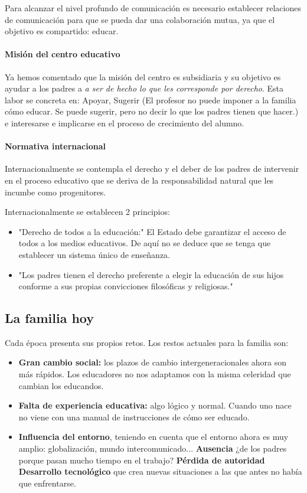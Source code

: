 \documentclass[palatino]{apuntesURJC}
\begin{document}
Para alcanzar el nivel profundo de comunicación es necesario establecer relaciones de comunicación para que se pueda dar una colaboración mutua, ya que el objetivo es compartido: educar.

\paragraph{Misión del centro educativo}

Ya hemos comentado que la misión del centro es subsidiaria y su objetivo es ayudar a los padres a \textit{a ser de hecho lo que les corresponde por derecho}. Esta labor se concreta en: Apoyar, Sugerir (El profesor no puede imponer a la familia cómo educar. Se puede sugerir, pero no decir lo que los padres tienen que hacer.) e interesarse e implicarse en el proceso de crecimiento del alumno.

\paragraph{Normativa internacional}
Internacionalmente se contempla el derecho y el deber de los padres de intervenir en el proceso educativo que se deriva de la responsabilidad natural que les incumbe como progenitores.

Internacionalmente se establecen 2 principios:

\begin{itemize}
	\item "Derecho de todos a la educación:" El Estado debe garantizar el acceso de todos a los medios educativos. 
	De aquí no se deduce que se tenga que establecer un sistema único de enseñanza.
	\item "Los padres tienen el derecho preferente a elegir la educación de sus hijos conforme a sus propias convicciones filosóficas y religiosas."
\end{itemize}

\subsection{La familia hoy}

Cada época presenta sus propios retos. 
%
Los restos actuales para la familia son:

\begin{itemize}
	\item \textbf{Gran cambio social:} los plazos de cambio intergeneracionales ahora son más rápidos. 
	Los educadores no nos adaptamos con la misma celeridad que cambian los educandos.
	\item \textbf{Falta de experiencia educativa: } algo lógico y normal. 
	Cuando uno nace no viene con una manual de instrucciones de cómo ser educado.
	
	\item \textbf{Influencia del entorno}, teniendo en cuenta que el entorno ahora es muy amplio: globalización, mundo intercomunicado... 
	\subitem \textbf{Ausencia} ¿de los padres porque pasan mucho tiempo en el trabajo?
	\subitem \textbf{Pérdida de autoridad}
	\subitem \textbf{Desarrollo tecnológico} que crea nuevas situaciones a las que antes no había que enfrentarse.
\end{itemize}
\end{document}
